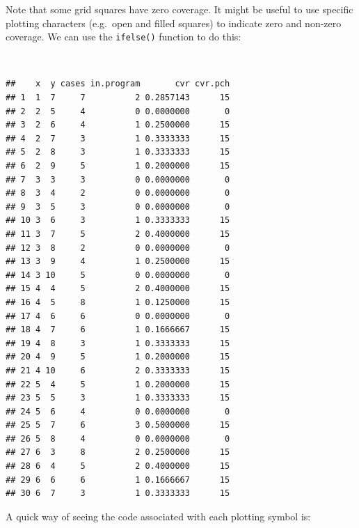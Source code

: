\documentclass[12pt,a4paper]{book}
\newenvironment{Shaded}{\begin{snugshade}}{\end{snugshade}}
\newcommand{\KeywordTok}[1]{\textcolor[rgb]{0.13,0.29,0.53}{\textbf{#1}}}
\newcommand{\DecValTok}[1]{\textcolor[rgb]{0.00,0.00,0.81}{#1}}
\newcommand{\StringTok}[1]{\textcolor[rgb]{0.31,0.60,0.02}{#1}}
\newcommand{\OperatorTok}[1]{\textcolor[rgb]{0.81,0.36,0.00}{\textbf{#1}}}
\newcommand{\NormalTok}[1]{#1}
\theoremstyle{definition}
\theoremstyle{definition}
\theoremstyle{definition}
\theoremstyle{remark}
\begin{document}
\newpage

Note that some grid squares have zero coverage. It might be useful to
use specific plotting characters (e.g.~open and filled squares) to
indicate zero and non-zero coverage. We can use the \texttt{ifelse()}
function to do this:

~

\begin{Shaded}
\end{Shaded}

\begin{verbatim}
##    x  y cases in.program       cvr cvr.pch
## 1  1  7     7          2 0.2857143      15
## 2  2  5     4          0 0.0000000       0
## 3  2  6     4          1 0.2500000      15
## 4  2  7     3          1 0.3333333      15
## 5  2  8     3          1 0.3333333      15
## 6  2  9     5          1 0.2000000      15
## 7  3  3     3          0 0.0000000       0
## 8  3  4     2          0 0.0000000       0
## 9  3  5     3          0 0.0000000       0
## 10 3  6     3          1 0.3333333      15
## 11 3  7     5          2 0.4000000      15
## 12 3  8     2          0 0.0000000       0
## 13 3  9     4          1 0.2500000      15
## 14 3 10     5          0 0.0000000       0
## 15 4  4     5          2 0.4000000      15
## 16 4  5     8          1 0.1250000      15
## 17 4  6     6          0 0.0000000       0
## 18 4  7     6          1 0.1666667      15
## 19 4  8     3          1 0.3333333      15
## 20 4  9     5          1 0.2000000      15
## 21 4 10     6          2 0.3333333      15
## 22 5  4     5          1 0.2000000      15
## 23 5  5     3          1 0.3333333      15
## 24 5  6     4          0 0.0000000       0
## 25 5  7     6          3 0.5000000      15
## 26 5  8     4          0 0.0000000       0
## 27 6  3     8          2 0.2500000      15
## 28 6  4     5          2 0.4000000      15
## 29 6  6     6          1 0.1666667      15
## 30 6  7     3          1 0.3333333      15
\end{verbatim}

\newpage

A quick way of seeing the code associated with each plotting symbol is:
\end{document}
